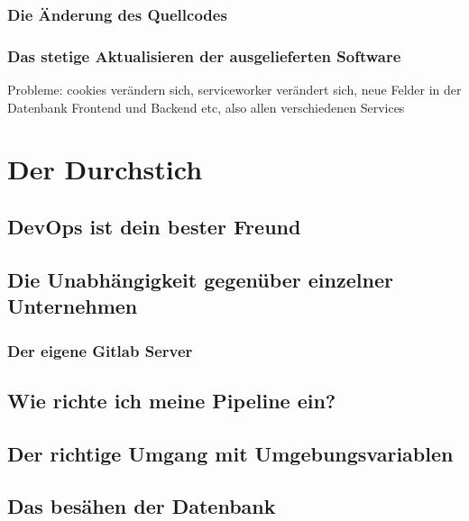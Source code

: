 \subsection{Die Änderung des Quellcodes}

\subsection{Das stetige Aktualisieren der ausgelieferten Software}
Probleme: cookies verändern sich, serviceworker verändert sich, neue Felder in der Datenbank
Frontend und Backend etc, also allen verschiedenen Services

\chapter{Der Durchstich}

\section{DevOps ist dein bester Freund}

\section{Die Unabhängigkeit gegenüber einzelner Unternehmen}
\subsection{Der eigene Gitlab Server}

\section{Wie richte ich meine Pipeline ein?}

\section{Der richtige Umgang mit Umgebungsvariablen}

\section{Das besähen der Datenbank}

